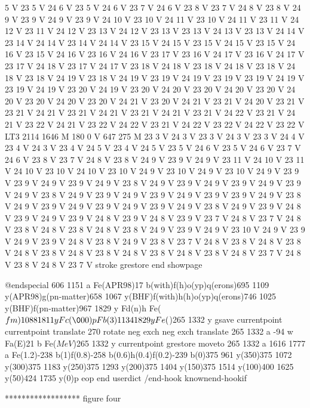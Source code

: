 5 V 23 5 V 24 6 V 23 5 V 24 6 V 23 7 V 24 6 V 23 8 V 23 7 V 24 8 V
23 8 V 24 9 V 23 9 V 24 9 V 23 9 V 24 10 V 23 10 V 24 11 V 23 10 V
24 11 V 23 11 V 24 12 V 23 11 V 24 12 V 23 13 V 24 12 V 23 13 V 23
13 V 24 13 V 23 13 V 24 14 V 23 14 V 24 14 V 23 14 V 24 14 V 23 15
V 24 15 V 23 15 V 24 15 V 23 15 V 24 16 V 23 15 V 24 16 V 23 16 V 24
16 V 23 17 V 23 16 V 24 17 V 23 16 V 24 17 V 23 17 V 24 18 V 23 17
V 24 17 V 23 18 V 24 18 V 23 18 V 24 18 V 23 18 V 24 18 V 23 18 V 24
19 V 23 18 V 24 19 V 23 19 V 24 19 V 23 19 V 23 19 V 24 19 V 23 19
V 24 19 V 23 20 V 24 19 V 23 20 V 24 20 V 23 20 V 24 20 V 23 20 V 24
20 V 23 20 V 24 20 V 23 20 V 24 21 V 23 20 V 24 21 V 23 21 V 24 20
V 23 21 V 23 21 V 24 21 V 23 21 V 24 21 V 23 21 V 24 21 V 23 21 V 24
22 V 23 21 V 24 21 V 23 22 V 24 21 V 23 22 V 24 22 V 23 21 V 24 22
V 23 22 V 24 22 V 23 22 V LT3 2114 1646 M 180 0 V 647 275 M 23 3 V
24 3 V 23 3 V 24 3 V 23 3 V 24 4 V 23 4 V 24 3 V 23 4 V 24 5 V 23 4
V 24 5 V 23 5 V 24 6 V 23 5 V 24 6 V 23 7 V 24 6 V 23 8 V 23 7 V 24
8 V 23 8 V 24 9 V 23 9 V 24 9 V 23 11 V 24 10 V 23 11 V 24 10 V 23
10 V 24 10 V 23 10 V 24 9 V 23 10 V 24 9 V 23 10 V 24 9 V 23 9 V 23
9 V 24 9 V 23 9 V 24 9 V 23 8 V 24 9 V 23 9 V 24 9 V 23 9 V 24 9 V
23 9 V 24 9 V 23 8 V 24 9 V 23 9 V 24 9 V 23 9 V 24 9 V 23 9 V 23 9
V 24 9 V 23 8 V 24 9 V 23 9 V 24 9 V 23 9 V 24 9 V 23 9 V 24 9 V 23
8 V 24 9 V 23 9 V 24 8 V 23 9 V 24 9 V 23 9 V 24 8 V 23 9 V 24 8 V
23 9 V 23 7 V 24 8 V 23 7 V 24 8 V 23 8 V 24 8 V 23 8 V 24 8 V 23 8
V 24 9 V 23 9 V 24 9 V 23 10 V 24 9 V 23 9 V 24 9 V 23 9 V 24 8 V 23
8 V 24 9 V 23 8 V 23 7 V 24 8 V 23 8 V 24 8 V 23 8 V 24 8 V 23 8 V
24 8 V 23 8 V 24 8 V 23 8 V 24 8 V 23 8 V 24 8 V 23 7 V 24 8 V 23 8
V 24 8 V 23 7 V stroke grestore end showpage
 
@endspecial
606 1151 a Fe(APR98)17 b(with)f(h)o(yp)q(erons)695 1109
y(APR98)g(pn-matter)658 1067 y(BHF)f(with)h(h)o(yp)q(erons)746
1025 y(BHF)f(pn-matter)967 1829 y Fd(n)h Fe(\(fm)1088
1811 y Fc(\000)p Fb(3)1134 1829 y Fe(\))265 1332 y
 gsave currentpoint currentpoint translate 270 rotate neg exch neg
exch translate
 265
1332 a -94 w Fa(E)21 b Fe(\(MeV\))265 1332 y
 currentpoint grestore moveto
 265 1332
a 1616 1777 a Fe(1.2)-238 b(1)f(0.8)-258 b(0.6)h(0.4)f(0.2)-239
b(0)375 961 y(350)375 1072 y(300)375 1183 y(250)375 1293
y(200)375 1404 y(150)375 1514 y(100)400 1625 y(50)424
1735 y(0)p eop
end
userdict /end-hook known{end-hook}if



******************        figure four 


